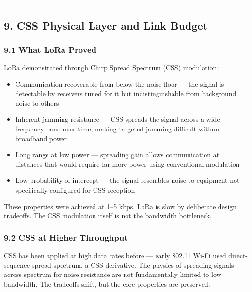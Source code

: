 \documentclass[
  11pt,
]{article}
\providecommand{\tightlist}{%
  \setlength{\itemsep}{0pt}\setlength{\parskip}{0pt}}
\begin{document}
\begin{center}\rule{0.5\linewidth}{0.5pt}\end{center}

\hypertarget{css-physical-layer-and-link-budget}{%
\subsection{9. CSS Physical Layer and Link
Budget}\label{css-physical-layer-and-link-budget}}

\hypertarget{what-lora-proved}{%
\subsubsection{9.1 What LoRa Proved}\label{what-lora-proved}}

LoRa demonstrated through Chirp Spread Spectrum (CSS) modulation:

\begin{itemize}
\tightlist
\item
  Communication recoverable from below the noise floor --- the signal is
  detectable by receivers tuned for it but indistinguishable from
  background noise to others
\item
  Inherent jamming resistance --- CSS spreads the signal across a wide
  frequency band over time, making targeted jamming difficult without
  broadband power
\item
  Long range at low power --- spreading gain allows communication at
  distances that would require far more power using conventional
  modulation
\item
  Low probability of intercept --- the signal resembles noise to
  equipment not specifically configured for CSS reception
\end{itemize}

These properties were achieved at 1--5 kbps. LoRa is slow by deliberate
design tradeoffs. The CSS modulation itself is not the bandwidth
bottleneck.

\hypertarget{css-at-higher-throughput}{%
\subsubsection{9.2 CSS at Higher
Throughput}\label{css-at-higher-throughput}}

CSS has been applied at high data rates before --- early 802.11 Wi-Fi
used direct-sequence spread spectrum, a CSS derivative. The physics of
spreading signals across spectrum for noise resistance are not
fundamentally limited to low bandwidth. The tradeoffs shift, but the
core properties are preserved:
\end{document}
